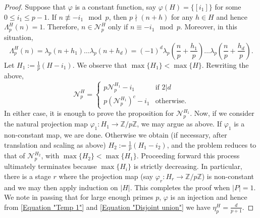\documentclass[10pt,a4paper]{amsart}
\newcommand{\Z}{\mathbb{Z}}
\begin{document}
\begin{proof}
		Suppose that $\varphi$ is a constant function, say $\varphi(H) = \{[i_1]\}$ for some $0\leqslant i_1\leqslant p-1$. If $n\not\equiv -i_1\mod p$, then $p\nmid (n+h)$ for any $h\in H$ and hence $\Lambda_p^H(n)=1$. Therefore, $n\in \mathcal{N}_p^H$ only if $n\equiv -i_1\mod p$. Moreover, in this situation,
		\[
		\Lambda_p^H(n) = \lambda_p(n+h_1)\ldots\lambda_p(n+h_d) = (-1)^d \lambda_p\left(\frac{n}{p} + \frac{h_1}{p}\right)\ldots \lambda_p\left(\frac{n}{p} + \frac{h_d}{p}\right).
		\]
		Let $H_1:=\frac{1}{p}(H-i_1)$. We observe that $\max\{H_1\} < \max\{H\}$. Rewriting the above,
		\begin{equation}\label{Equation "Calculation"}
			\mathcal{N}_p^H = \begin{cases}
				p \mathcal{N}_p^{H_1} - i_1&\mbox{if }2| d\\
				p \left(\mathcal{N}_p^{H_1}\right)^c - i_1&\mbox{otherwise.}
			\end{cases}
		\end{equation}
		In either case, it is enough to prove the proposition for $\mathcal{N}_p^{H_1}$. Now, if we consider the natural projection map $\varphi_1: H_1\to \Z/p\Z$, we may argue as above. If $\varphi_1$ is a non-constant map, we are done. Otherwise we obtain (if necessary, after translation and scaling as above) $H_2:= \frac{1}{p} (H_1-i_2)$, and the problem reduces to that of $\mathcal{N}_p^{H_2}$, with $\max\{H_2\} < \max\{H_1\}$. Proceeding forward this process ultimately terminates because $\max\{H_i\}$ is strictly decreasing. In particular, there is a stage $r$ where the projection map (say $\varphi_r : H_r\to \Z/p\Z$) is non-constant and we may then apply induction on $|H|$. This completes the proof when $|P|=1$. We note in passing that for large enough primes $p$, $\varphi$ is an injection and hence from \eqref{Equation "Temp 1"} and \eqref{Equation "Disjoint union"} we have $\eta_p^H = \frac{d}{p+1}.$
		

\end{proof}
\end{document}
